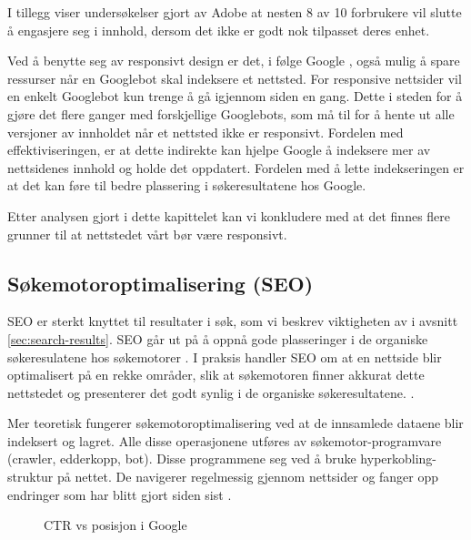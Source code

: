 I tillegg viser undersøkelser gjort av Adobe \cite{stark2015frf} at nesten 8 av 10 forbrukere vil slutte å engasjere seg i innhold, dersom det ikke er godt nok tilpasset deres enhet.

Ved å benytte seg av responsivt design er det, i følge Google \cite{google2018rwd}, også mulig å spare ressurser når en Googlebot skal indeksere et nettsted. For responsive nettsider vil en enkelt Googlebot kun trenge å gå igjennom siden en gang. Dette i steden for å gjøre det flere ganger med forskjellige Googlebots, som må til for å hente ut alle versjoner av innholdet når et nettsted ikke er responsivt. Fordelen med effektiviseringen, er at dette indirekte kan hjelpe Google å indeksere mer av nettsidenes innhold og holde det oppdatert. Fordelen med å lette indekseringen er at det kan føre til bedre plassering i søkeresultatene hos Google.  

Etter analysen gjort i dette kapittelet kan vi konkludere med at det finnes flere grunner til at nettstedet vårt bør være responsivt.

\subsection{Søkemotoroptimalisering (SEO)}
\label{sec:concepts-seo}
SEO er sterkt knyttet til resultater i søk, som vi beskrev viktigheten av i avsnitt \ref{sec:search-results}. SEO går ut på å oppnå gode plasseringer i de organiske søkeresulatene hos søkemotorer \cite[s.~16]{flensted10smg}. I praksis handler SEO om at en nettside blir optimalisert på en rekke områder, slik at søkemotoren finner akkurat dette nettstedet og presenterer det godt synlig i de organiske søkeresultatene. \cite[s.~20]{flensted10smg}.

Mer teoretisk fungerer søkemotoroptimalisering ved at de innsamlede dataene blir indeksert og lagret. Alle disse operasjonene utføres av søkemotor-programvare (crawler, edderkopp,
bot). Disse programmene  seg ved å bruke hyperkobling-struktur på nettet. De navigerer regelmessig gjennom nettsider og fanger opp endringer som har blitt gjort siden sist  \cite[s.~488]{yalccin2010search}.

\begin{figure}[H]
    \centering
    \caption{CTR vs posisjon i Google}
    \label{fig:analysis-awr-google-ctr}
\end{figure}

